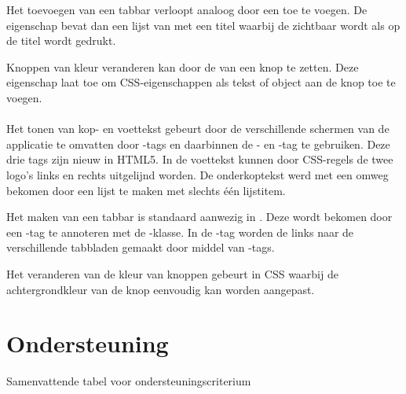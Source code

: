Het toevoegen van een tabbar verloopt analoog door een  toe te voegen.
De  eigenschap bevat dan een lijst van  met een titel waarbij de  zichtbaar wordt als op de titel wordt gedrukt.

Knoppen van kleur veranderen kan door de  van een knop te zetten.
Deze eigenschap laat toe om CSS-eigenschappen als tekst of object aan de knop toe te voegen.

\paragraph{\lungo}
Het tonen van kop- en voettekst gebeurt door de verschillende schermen van de applicatie te omvatten door -tags en daarbinnen de - en -tag te gebruiken.
Deze drie tags zijn nieuw in HTML5.
In de voettekst kunnen door CSS-regels de twee logo's links en rechts uitgelijnd worden.
De onderkoptekst werd met een omweg bekomen door een lijst te maken met slechts één lijstitem.

Het maken van een tabbar is standaard aanwezig in \lungo{}.
Deze wordt bekomen door een -tag te annoteren met de -klasse.
In de -tag worden de links naar de verschillende tabbladen gemaakt door middel van -tags.

Het veranderen van de kleur van knoppen gebeurt in CSS waarbij de achtergrondkleur van de knop eenvoudig kan worden aangepast.


\section{Ondersteuning}
\label{sec:evaluatie-ondersteuning}

\begin{table}[H]
\centering
{}
\caption{Samenvattende tabel voor ondersteuningscriterium}
\label{tabel:evaluatie-ondersteuning}
\end{table}


